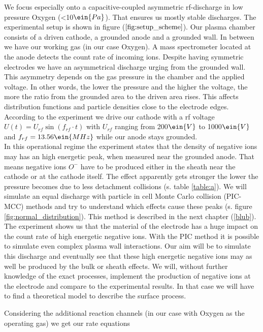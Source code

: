 We focus especially onto a capacitive-coupled asymmetric rf-discharge in low pressure Oxygen (<10$\ein{Pa}$). 
That ensures us mostly stable discharges.
The experimental setup is shown in figure ($\ref{fig:setup_scheme}$). 
Our plasma chamber consists of a driven cathode, a grounded anode and a grounded wall. 
In between we have our working gas (in our case Oxygen). 
A mass spectrometer located at the anode detects the count rate of incoming ions. 
Despite having symmetric electrodes we have an asymmetrical discharge urging from the grounded wall. 
This asymmetry depends on the gas pressure in the chamber and the applied voltage. 
In other words, the lower the pressure and the higher the voltage, the more the ratio from the grounded area to the driven area rises.   
This affects distribution functions and particle densities close to the electrode edges.
\\
According to the experiment we drive our cathode with a rf voltage $U(t)=U_{rf}\sin{(f_{rf}\cdot t)}$ with $U_{rf}$ ranging from 200$\ein{V}$ to 1000$\ein{V}$ and $f_{rf}=13.56\ein{MHz}$ while our anode stays grounded. \\
In this operational regime the experiment states that the density of negative ions may has an high energetic peak, when measured near the grounded anode. 
That means negative ions $O^-$ have to be produced either in the sheath near the cathode or at the cathode itself. 
The effect apparently gets stronger the lower the pressure becomes due to less detachment collisions (s. table \ref{table:a}). 
We will simulate an equal discharge with particle in cell Monte Carlo collision (PIC-MCC) methods and try to understand which effects cause these 
peaks (s. figure \ref{fig:normal_distribution}).  
This method is described in the next chapter (\ref{blub}).\\
The experiment shows us that the material of the electrode has a huge impact on the count rate of high energetic negative ions. 
With the PIC method it is possible to simulate even complex plasma wall interactions.
Our aim will be to simulate this discharge and eventually see that these high energetic negative ions may as well be produced by the bulk or sheath effects. 
We will, without further knowledge of the exact processes, implement the production of negative ions at the electrode and compare to the experimental results. 
In that case we will have to find a theoretical model to describe the surface process.




Considering the additional reaction channels (in our case with Oxygen as the operating gas) we get our rate equations

